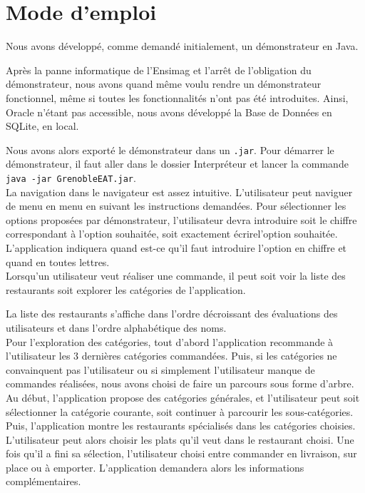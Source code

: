 \documentclass[10pt, a4paper]{article}
\begin{document}
\section{Mode d'emploi}

Nous avons développé, comme demandé initialement, un démonstrateur en Java.

Après la panne informatique de l'Ensimag et l'arrêt de l'obligation du démonstrateur, nous avons quand même voulu rendre un démonstrateur fonctionnel, même si toutes les fonctionnalités n'ont pas été introduites. Ainsi, Oracle n'étant pas accessible, nous avons développé la Base de Données en SQLite, en local.

Nous avons alors exporté le démonstrateur dans un \texttt{.jar}. Pour démarrer le démonstrateur, il faut aller dans le dossier Interpréteur et lancer la commande \texttt{java -jar GrenobleEAT.jar}. \\


La navigation dans le navigateur est assez intuitive. L'utilisateur peut naviguer de menu en menu en suivant les instructions demandées. Pour sélectionner les options proposées par  démonstrateur, l'utilisateur devra introduire soit le chiffre correspondant à l'option souhaitée, soit exactement écrirel'option souhaitée. L'application indiquera quand est-ce qu'il faut introduire l'option en chiffre et quand en toutes lettres. \\

Lorsqu'un utilisateur veut réaliser une commande, il peut soit voir la liste des restaurants soit explorer les catégories de l'application.

La liste des restaurants s'affiche dans l'ordre décroissant des évaluations des utilisateurs et dans l'ordre alphabétique des noms. \\

Pour l'exploration des catégories, tout d'abord l'application recommande à l'utilisateur les 3 dernières catégories commandées. Puis, si les catégories ne convainquent pas l'utilisateur ou si simplement l'utilisateur manque de commandes réalisées, nous avons choisi de faire un parcours sous forme d'arbre. Au début, l'application propose des catégories générales, et l'utilisateur peut soit sélectionner la catégorie courante, soit continuer à parcourir les sous-catégories. Puis, l'application montre les restaurants spécialisés dans les catégories choisies. \\

L'utilisateur peut alors choisir les plats qu'il veut dans le restaurant choisi. Une fois qu'il a fini sa sélection, l'utilisateur choisi entre commander en livraison, sur place ou à emporter. L'application demandera alors les informations complémentaires. \\
\end{document}
